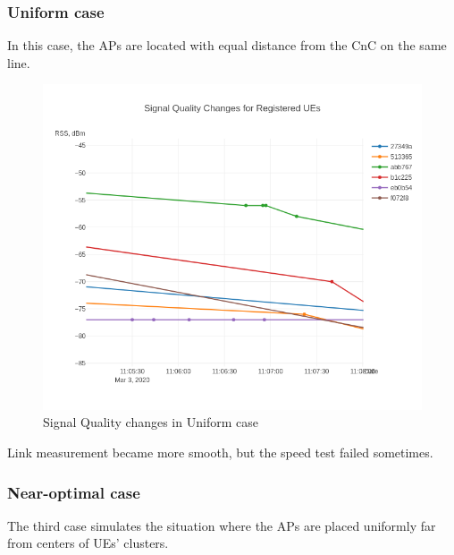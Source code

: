 \subsubsection{Uniform case}\label{uniform-case}

In this case, the APs are located with equal distance from the CnC on the same line.

\begin{figure}[H]
	\centering
	\includegraphics[width=\linewidth,keepaspectratio]{images/Exp4_Uniform.png}
\caption{Signal Quality changes in Uniform case}
\end{figure}

Link measurement became more smooth, but the speed test failed
sometimes.

\subsubsection{Near-optimal case}\label{near-optimal-case}

The third case simulates the situation where the APs are placed
uniformly far from centers of UEs' clusters.


